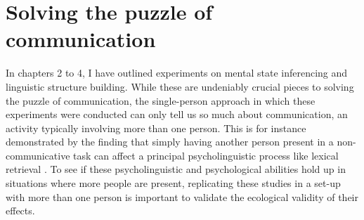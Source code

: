 \section{Solving the puzzle of communication}

In chapters 2 to 4, I have outlined experiments on mental state inferencing and linguistic structure building. While these are undeniably crucial pieces to solving the puzzle of communication, the single-person approach in which these experiments were conducted can only tell us so much about communication, an activity typically involving more than one person. This is for instance demonstrated by the finding that simply having another person present in a non-communicative task can affect a principal psycholinguistic process like lexical retrieval \citep{kuhlen2017having}. To see if these psycholinguistic and psychological abilities hold up in situations where more people are present, replicating these studies in a set-up with more than one person is important to validate the ecological validity of their effects.


